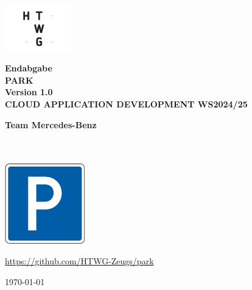 \begin{titlepage}
    \begin{center}
        \vspace{0.5cm}
        
        \includegraphics[height=2cm]{resources/htwg-logo.png}
        
        \vspace{1.5cm}

        \Huge{\textbf{Endabgabe\\}}
        \vspace{0.5cm}
        \Huge{\textbf{PARK \\ Version 1.0 \\}}
        \vspace{0.5cm}
        \Huge{\textbf{CLOUD APPLICATION DEVELOPMENT WS2024/25}}
    
        \vspace{1.5cm}
 
        \Large{
            \textbf{Team Mercedes-Benz} \\
            \authorlukasb \\
            \authorjonas \\
            \authorlukase
        }
 
        \vspace{1.5cm}
        
        \includegraphics[height=3.5cm]{resources/logo.png}

        \vspace{1.5cm}

        \Large{
            \url{https://github.com/HTWG-Zeugs/park}
        }
        \vspace{1.5cm}

        \large{\today}
      
    \end{center}
 \end{titlepage}

\newpage
